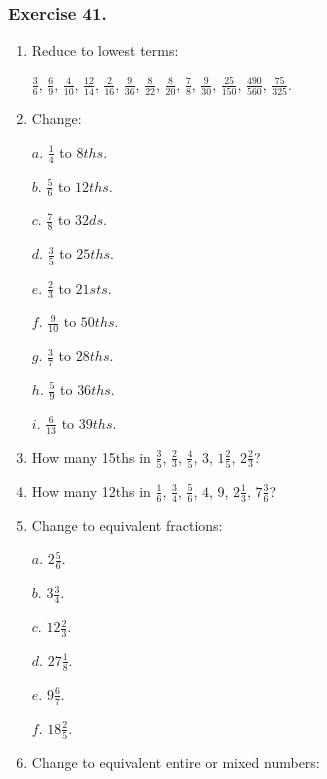 \documentclass{book}
\begin{document}
\subsubsection*{Exercise 41.\footnotemark}

\begin{enumerate}

\item Reduce to lowest terms:

$\frac{3}{6}$, $\frac{6}{9}$, $\frac{4}{10}$, $\frac{12}{14}$, $\frac{2}{16}$, $\frac{9}{36}$, $\frac{8}{22}$, $\frac{8}{20}$, $\frac{7}{8}$, $\frac{9}{30}$, $\frac{25}{150}$, $\frac{490}{560}$, $\frac{75}{325}$.

\item Change:

$a$. $\frac{1}{4}$ to $8ths$.

$b$. $\frac{5}{6}$ to $12ths$.

$c$. $\frac{7}{8}$ to $32ds$.

$d$. $\frac{3}{5}$ to $25ths$.

$e$. $\frac{2}{3}$ to $21sts$.

$f$. $\frac{9}{10}$ to $50ths$.

$g$. $\frac{3}{7}$ to $28ths$.

$h$. $\frac{5}{9}$ to $36ths$.

$i$. $\frac{6}{13}$ to $39ths$.

\item How many 15ths in $\frac{3}{5}$, $\frac{2}{3}$,
$\frac{4}{5}$, $3$, $1\frac{2}{5}$, $2\frac{2}{3}$?

\item How many 12ths in $\frac{1}{6}$, $\frac{3}{4}$,
$\frac{5}{6}$, $4$, $9$, $2\frac{1}{3}$, $7\frac{3}{6}$?

\item Change to equivalent fractions:

$a$. $2\frac{5}{6}$.

$b$. $3\frac{3}{4}$.

$c$. $12\frac{2}{3}$.

$d$. $27\frac{1}{8}$.

$e$. $9\frac{6}{7}$.

$f$. $18\frac{2}{5}$.

\item Change to equivalent entire or mixed numbers:


\end{enumerate}
\end{document}
